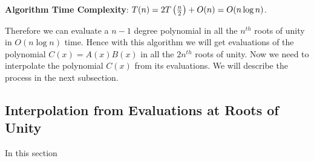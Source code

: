 \textbf{Algorithm Time Complexity}: $T(n)=2T\left(\frac{n}2\right)+O(n)=O(n\log n)$.\parinn

 Therefore we can evaluate a $n-1$ degree polynomial in all the $n^{th}$ roots of unity in $O(n\log n)$ time. Hence with this algorithm we will get evaluations of the polynomial $C(x)=A(x)B(x)$ in all the $2n^{th}$ roots of unity. Now we need to interpolate the polynomial $C(x)$ from its evaluations. We will describe the process in the next subsection.
 \subsection{Interpolation from Evaluations at Roots of Unity}In this section